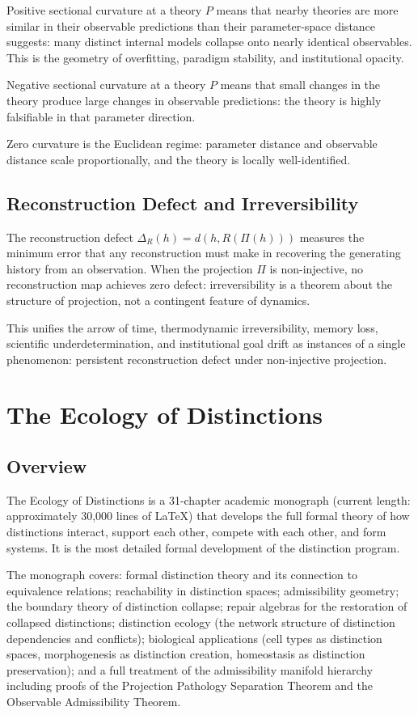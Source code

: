 \documentclass[12pt,a4paper]{book}
\theoremstyle{remark}
\theoremstyle{definition}
\begin{document}
Positive sectional curvature at a theory $P$ means that nearby theories
are more similar in their observable predictions than their parameter-space
distance suggests: many distinct internal models collapse onto nearly
identical observables. This is the geometry of overfitting, paradigm
stability, and institutional opacity.

Negative sectional curvature at a theory $P$ means that small changes
in the theory produce large changes in observable predictions: the theory
is highly falsifiable in that parameter direction.

Zero curvature is the Euclidean regime: parameter distance and observable
distance scale proportionally, and the theory is locally well-identified.

\section{Reconstruction Defect and Irreversibility}

The reconstruction defect $\Delta_R(h) = d(h, R(\Pi(h)))$ measures the
minimum error that any reconstruction must make in recovering the generating
history from an observation. When the projection $\Pi$ is non-injective,
no reconstruction map achieves zero defect: irreversibility is a theorem
about the structure of projection, not a contingent feature of dynamics.

This unifies the arrow of time, thermodynamic irreversibility, memory loss,
scientific underdetermination, and institutional goal drift as instances
of a single phenomenon: persistent reconstruction defect under non-injective
projection.

\chapter{The Ecology of Distinctions}

\section{Overview}

The Ecology of Distinctions is a 31-chapter academic monograph (current
length: approximately 30,000 lines of \LaTeX) that develops the full
formal theory of how distinctions interact, support each other, compete
with each other, and form systems. It is the most detailed formal
development of the distinction program.

The monograph covers: formal distinction theory and its connection to
equivalence relations; reachability in distinction spaces; admissibility
geometry; the boundary theory of distinction collapse; repair algebras
for the restoration of collapsed distinctions; distinction ecology
(the network structure of distinction dependencies and conflicts);
biological applications (cell types as distinction spaces, morphogenesis
as distinction creation, homeostasis as distinction preservation); and
a full treatment of the admissibility manifold hierarchy including proofs
of the Projection Pathology Separation Theorem and the Observable
Admissibility Theorem.
\end{document}
